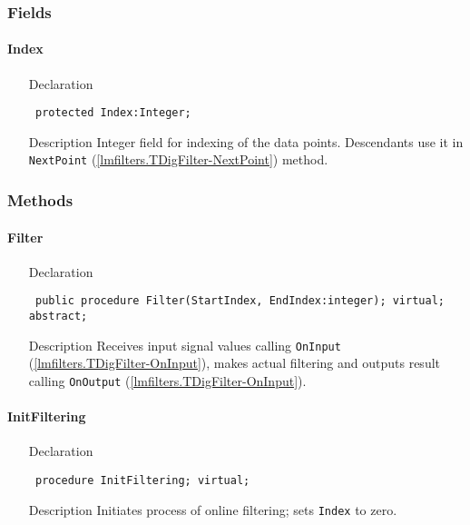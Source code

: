 \documentclass[12pt,a4paper,oneside]{report}
\newcommand{\declarationitem}[1]{{\addfontfeatures{FakeSlant} #1}}
\newcommand{\descriptiontitle}[1]{{\addfontfeatures{FakeSlant}#1}}
\newcommand{\code}[1]{\texttt{#1}}
\begin{document}
\subsubsection{Fields}
\paragraph{Index}\label{lmfilters.TDigFilter-index}
\begin{itemize}
	\item[\declarationitem{Declaration}\hfill]
	\begin{flushleft}
		\code{
			protected Index:Integer;}
	\end{flushleft}
	\par  
\item[\descriptiontitle{Description}]
Integer field for indexing of the data points. Descendants use it in \code{NextPoint} (\ref{lmfilters.TDigFilter-NextPoint}) method.
\end{itemize}
\subsubsection{Methods}
\paragraph{Filter}
\label{lmfilters.TDigFilter-Filter}
\begin{itemize}\item[\declarationitem{Declaration}\hfill]
	\begin{flushleft}
		\code{
			public procedure Filter(StartIndex, EndIndex:integer); virtual; abstract;}
	\end{flushleft}
	\par
	\item[\descriptiontitle{Description}]
	Receives input signal values calling \code{OnInput} (\ref{lmfilters.TDigFilter-OnInput}), makes actual filtering and outputs result calling \code{OnOutput} (\ref{lmfilters.TDigFilter-OnInput}).
\end{itemize}
\paragraph{InitFiltering}
\label{lmfilters.TDigFilter-InitFiltering}
\begin{itemize}\item[\declarationitem{Declaration}\hfill]
	\begin{flushleft}
		\code{
			procedure InitFiltering; virtual;}
	\end{flushleft}
	\item[\descriptiontitle{Description}] Initiates process of online filtering; sets \code{Index} to zero.
\end{itemize}
\end{document}
